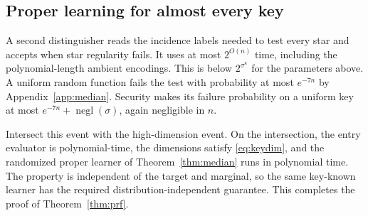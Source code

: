 \documentclass[11pt,letterpaper,pmlr,twoside]{jmlr}
\newcommand{\negl}{\operatorname{negl}}
\begin{document}
\subsection{Proper learning for almost every key}
A second distinguisher reads the incidence labels needed to test every star and accepts when star regularity fails. It uses at most $2^{O(n)}$ time, including the polynomial-length ambient encodings. This is below $2^{\sigma^\kappa}$ for the parameters above. A uniform random function fails the test with probability at most $e^{-7n}$ by Appendix~\ref{app:median}. Security makes its failure probability on a uniform key at most $e^{-7n}+\negl(\sigma)$, again negligible in $n$.

Intersect this event with the high-dimension event. On the intersection, the entry evaluator is polynomial-time, the dimensions satisfy \eqref{eq:keydim}, and the randomized proper learner of Theorem~\ref{thm:median} runs in polynomial time. The property is independent of the target and marginal, so the same key-known learner has the required distribution-independent guarantee. This completes the proof of Theorem~\ref{thm:prf}.

\end{document}

